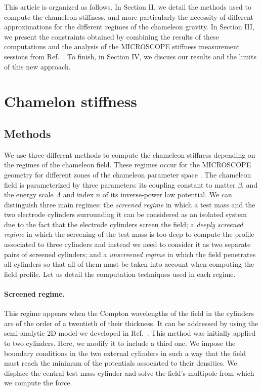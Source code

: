 \documentclass[aps,prd,twocolumn,superscriptaddress,nofootinbib,eqsecnumm,showpacs]{revtex4-1}
\renewcommand\({\left(}
\renewcommand\){\right)}
\renewcommand\[{\left[}
\renewcommand\]{\right]}
\begin{document}
This article is organized as follows. In Section II, we detail the methods used to compute the chameleon stiffness, and more particularly the necessity of different approximations for the different regimes of the chameleon gravity. In Section III, we present the constraints obtained by combining the results of these computations and the analysis of the MICROSCOPE stiffness measurement sessions from Ref.~\cite{CQG2}. To finish, in Section IV, we discuss our results and the limits of this new approach.



\section{Chamelon stiffness}

\subsection{Methods}
We use three different methods to compute the chameleon stiffness depending on the regimes of the chameleon field. These regimes occur for the MICROSCOPE geometry for different zones of the chameleon parameter space \cite{PRD1}. The chameleon field is parameterized by three parameters: its coupling constant to matter $\beta$, and the energy scale $\Lambda$ and index $n$ of its inverse-power law potential. We can distinguish three main regimes: the {\em screened regime} in which a test mass and the two electrode cylinders surrounding it can be considered as an isolated system due to the fact that the electrode cylinders screen the field; a {\em deeply screened regime} in which the screening of the test mass is too deep to compute the profile associated to three cylinders and instead we need to consider it as two separate pairs of screened cylinders; and a {\em unscreened regime} in which the field penetrates all cylinders so that all of them must be taken into account when computing the field profile.  Let us detail the computation techniques used in each regime.

\paragraph{Screened regime.}
This regime appears when the Compton wavelengths of the field in the cylinders are of the order of a twentieth of their thickness. It can be addressed by using the semi-analytic 2D model we developed in Ref.~\cite{PRD2}. This method was initially applied to two cylinders. Here, we modify it to include a third one. We impose the boundary conditions in the two external cylinders in such a way that the field must reach the minimum of the potentials associated to their densities. We displace the central test mass cylinder and solve the field's multipole from which we compute the force.
\end{document}
